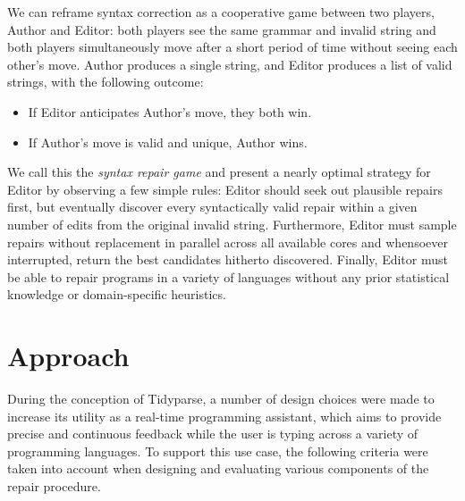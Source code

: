\documentclass[sigplan,screen]{acmart}
\begin{document}
We can reframe syntax correction as a cooperative game between two players, Author and Editor: both players see the same grammar and invalid string and both players simultaneously move after a short period of time without seeing each other's move. Author produces a single string, and Editor produces a list of valid strings, with the following outcome:

\begin{itemize}
  \item If Editor anticipates Author's move, they both win.
  \item If Author's move is valid and unique, Author wins.
\end{itemize}

We call this the \textit{syntax repair game} and present a nearly optimal strategy for Editor by observing a few simple rules: Editor should seek out plausible repairs first, but eventually discover every syntactically valid repair within a given number of edits from the original invalid string. Furthermore, Editor must sample repairs without replacement in parallel across all available cores and whensoever interrupted, return the best candidates hitherto discovered. Finally, Editor must be able to repair programs in a variety of languages without any prior statistical knowledge or domain-specific heuristics. %

\section{Approach}


During the conception of Tidyparse, a number of design choices were made to increase its utility as a real-time programming assistant, which aims to provide precise and continuous feedback while the user is typing across a variety of programming languages. To support this use case, the following criteria were taken into account when designing and evaluating various components of the repair procedure.
\end{document}
